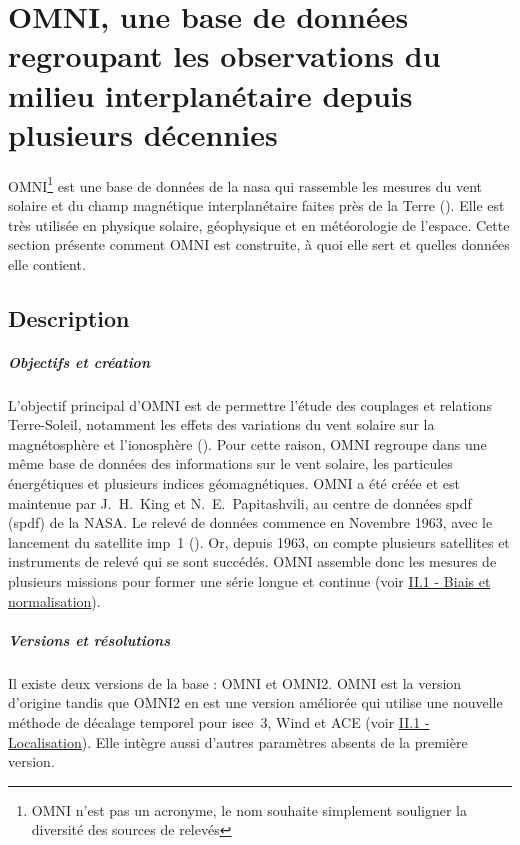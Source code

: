 
\chapter{OMNI, une base de données regroupant les observations du milieu interplanétaire depuis plusieurs décennies}

OMNI\footnote{OMNI n'est pas un acronyme, le nom souhaite simplement souligner la diversité des sources de relevés} est une base de données de la \acrshort{nasa} qui rassemble les mesures du vent solaire et du champ magnétique interplanétaire faites près de la Terre (\cite{SPDF_OMNIWeb}). 
Elle est très utilisée en physique solaire, géophysique et en météorologie de l'espace. 
Cette section présente comment OMNI est construite, à quoi elle sert et quelles données elle contient.

\section{Description}

\paragraph{Objectifs et création}
L'objectif principal d'OMNI est de permettre l'étude des couplages et relations Terre-Soleil, notamment les effets des variations du vent solaire sur la magnétosphère et l'ionosphère (\cite{OMNI_HRO_doc}).
Pour cette raison, OMNI regroupe dans une même base de données des informations sur le vent solaire, les particules énergétiques et plusieurs indices géomagnétiques. 
OMNI a été créée et est maintenue par J.~H.~King et N.~E.~Papitashvili, au centre de données \acrshort{spdf} (\acrlong{spdf}) de la NASA. 
Le relevé de données commence en Novembre 1963, avec le lancement du satellite \acrshort{imp}~1 (\cite{OMNI2_doc}). 
Or, depuis 1963, on compte plusieurs satellites et instruments de relevé qui se sont succédés. 
OMNI assemble donc les mesures de plusieurs missions pour former une série longue et continue (voir \hyperref[biais]{II.1 - Biais et normalisation}). 

\paragraph{Versions et résolutions}
Il existe deux versions de la base : OMNI et OMNI2. 
OMNI est la version d'origine tandis que OMNI2 en est une version améliorée qui utilise une nouvelle méthode de décalage temporel pour \acrshort{isee}~3, Wind et ACE (voir \hyperref[localisation]{II.1 - Localisation}). 
Elle intègre aussi d'autres paramètres absents de la première version.

